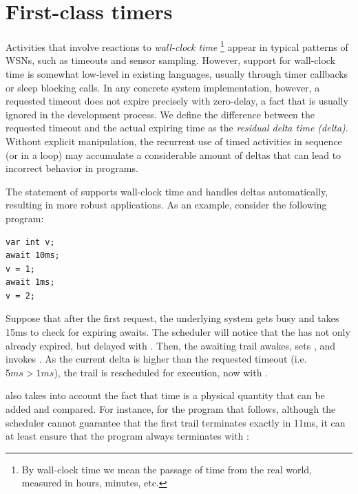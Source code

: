 \section{First-class timers}
\label{sec.ceu.wclocks}


Activities that involve reactions to \emph{wall-clock time}%
\footnote{
By wall-clock time we mean the passage of time from the real world, measured in 
hours, minutes, etc.
}
appear in typical patterns of WSNs, such as timeouts and sensor sampling.
However, support for wall-clock time is somewhat low-level in existing 
languages, usually through timer callbacks or sleep blocking calls.
%
In any concrete system implementation, however, a requested timeout does not 
expire precisely with zero-delay, a fact that is usually ignored in the 
development process.
We define the difference between the requested timeout and the actual expiring 
time as the \emph{residual delta time (delta)}.
Without explicit manipulation, the recurrent use of timed activities in 
sequence (or in a loop) may accumulate a considerable amount of deltas that can 
lead to incorrect behavior in programs.

The  statement of \CEU supports wall-clock time and handles deltas 
automatically, resulting in more robust applications.
As an example, consider the following program:

\nopagebreak
\noindent
\begin{minipage}{\linewidth}
\begin{lstlisting}[xleftmargin=2em]
var int v;
await 10ms;
v = 1;
await 1ms;
v = 2;
\end{lstlisting}
\end{minipage}

Suppose that after the first  request, the underlying system gets 
busy and takes 15ms to check for expiring awaits.
The \CEU scheduler will notice that the  has not only already 
expired, but delayed with .
Then, the awaiting trail awakes, sets , and invokes .
As the current delta is higher than the requested timeout (i.e. $5ms > 1ms$), 
the trail is rescheduled for execution, now with .

\CEU also takes into account the fact that time is a physical quantity that can 
be added and compared.
For instance, for the program that follows, although the scheduler cannot 
guarantee that the first trail terminates exactly in 11ms, it can at least 
ensure that the program always terminates with :

